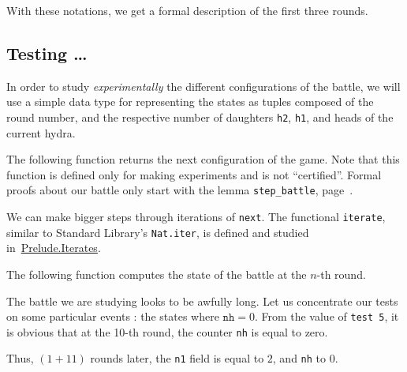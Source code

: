 With these notations, we get a formal description of the first three rounds.




\subsection{Testing  \dots}
In order to study \emph{experimentally} the different  configurations of the  battle, we will use a simple data type for representing the states as tuples composed of
the round number, and the respective number of daughters  \texttt{h2}, \texttt{h1}, and heads
of the current hydra.






The following function returns the next configuration of the game.
Note that this function is defined only for making experiments and is not  ``certified''.  Formal proofs about our battle only start with the lemma
\texttt{step\_battle}, page~\pageref{lemma:step-battle}.





We can make bigger steps through iterations of \texttt{next}.
The functional \texttt{iterate}, similar to Standard Library's \texttt{Nat.iter},
is defined and studied in~\href{../theories/html/hydras.Prelude.Iterates.html\#iterate}{Prelude.Iterates}.

\label{Functions:iterate}




The following function computes the state of the battle at the $n$-th round.



The battle we are studying looks to be awfully long. Let us concentrate our
tests on some particular events : the states where $\texttt{nh}=0$.
From the value of \texttt{test 5},  it is obvious that at the 10-th round, the counter \texttt{nh} is equal to zero.




Thus, $(1 + 11)$ rounds later, the \texttt{n1} field is equal to $2$, and 
\texttt{nh}   to $0$. 





